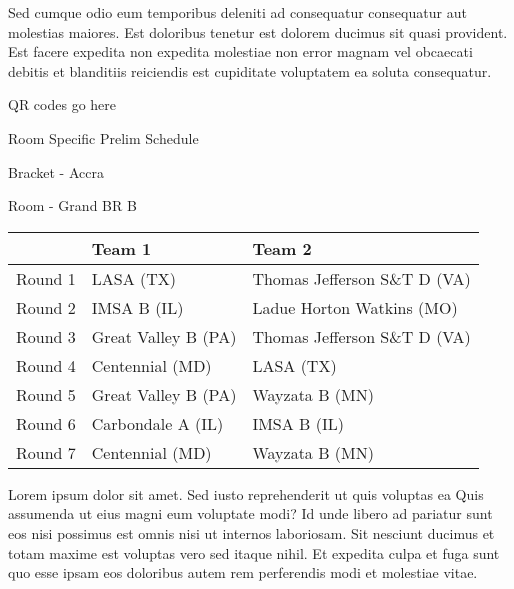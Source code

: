 \documentclass{article}%
\begin{document}
\newline%
Sed cumque odio eum temporibus deleniti ad consequatur consequatur aut molestias maiores. Est doloribus tenetur est dolorem ducimus sit quasi provident. Est facere expedita non expedita molestiae non error magnam vel obcaecati debitis et blanditiis reiciendis est cupiditate voluptatem ea soluta consequatur.%
\vspace*{140pt}%
\begin{center}%
\begin{Huge}%
QR codes go here%
\end{Huge}%
\end{center}%
\newpage%
\begin{center}%
\begin{Huge}%
Room Specific Prelim Schedule%
\end{Huge}%
\vspace*{8pt}%
\linebreak%
\begin{Large}%
Bracket {-} Accra%
\end{Large}%
\vspace*{8pt}%
\linebreak%
\vspace*{8pt}%
\begin{Large}%
Room {-} Grand BR B%
\end{Large}%
\end{center}%
%
\begin{tabularx}{\textwidth}{|c|Y|Y|}%
\hline%
&Team 1&Team 2\\%
\hline%
Round 1&LASA (TX)&Thomas Jefferson S\&T D (VA)\\%
Round 2&IMSA B (IL)&Ladue Horton Watkins (MO)\\%
Round 3&Great Valley B (PA)&Thomas Jefferson S\&T D (VA)\\%
Round 4&Centennial (MD)&LASA (TX)\\%
Round 5&Great Valley B (PA)&Wayzata B (MN)\\%
Round 6&Carbondale A (IL)&IMSA B (IL)\\%
Round 7&Centennial (MD)&Wayzata B (MN)\\%
\hline%
\end{tabularx}%
\vspace*{8pt}%
\newline%
Lorem ipsum dolor sit amet. Sed iusto reprehenderit ut quis voluptas ea Quis assumenda ut eius magni eum voluptate modi? Id unde libero ad pariatur sunt eos nisi possimus est omnis nisi ut internos laboriosam. Sit nesciunt ducimus et totam maxime est voluptas vero sed itaque nihil. Et expedita culpa et fuga sunt quo esse ipsam eos doloribus autem rem perferendis modi et molestiae vitae.\newline%
\end{document}
